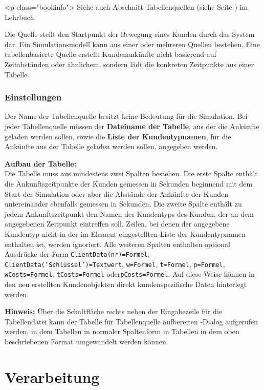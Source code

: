 <p class="bookinfo">
Siehe auch Abschnitt Tabellenquellen (siehe Seite \pageref{ref:book:9.3.1}) im Lehrbuch.

Die Quelle stellt den Startpunkt der Bewegung eines Kunden durch das System dar.
Ein Simulationsmodell kann aus einer oder mehreren Quellen bestehen.
Eine tabellenbasierte Quelle erstellt Kundenankünfte nicht basierend auf
Zeitabständen oder ähnlichem, sondern lädt die konkreten Zeitpunkte aus einer
Tabelle.

\subsection*{Einstellungen}

Der Name der Tabellenquelle besitzt keine Bedeutung für die Simulation.
Bei jeder Tabellenquelle müssen der \textbf{Dateiname der Tabelle}, aus
der die Ankünfte geladen werden sollen, sowie die \textbf{Liste der Kundentypnamen},
für die Ankünfte aus der Tabelle geladen werden sollen, angegeben werden.

\textbf{Aufbau der Tabelle:}~\\
Die Tabelle muss aus mindestens zwei Spalten bestehen. Die erste Spalte enthält die Ankunftszeitpunkte
der Kunden gemessen in Sekunden beginnend mit dem Start der Simulation oder aber die Abstände
der Ankünfte der Kunden untereinander ebenfalls gemessen in Sekunden. Die zweite Spalte
enthält zu jedem Ankunftszeitpunkt den Namen des Kundentyps des Kunden, der an dem
angegebenen Zeitpunkt eintreffen soll. Zeilen, bei denen der angegebene Kundentyp
nicht in der im Element eingestellten Liste der Kundentypnamen enthalten ist, werden ignoriert.
Alle weiteren Spalten enthalten optional Ausdrücke der Form \texttt{ClientData(nr)=Formel},
\texttt{ClientData('Schlüssel')=Textwert}, \texttt{w=Formel}, \texttt{t=Formel},
\texttt{p=Formel}, \texttt{wCosts=Formel}, \texttt{tCosts=Formel} oder\texttt{pCosts=Formel}.
Auf diese Weise können in den neu erstellten Kundenobjekten direkt kundenspezifische Daten
hinterlegt werden. 

\textbf{Hinweis:}
Über die Schaltfläche rechts neben der Eingabezeile für die Tabellendatei kann der
Tabelle für Tabellenquelle aufbereiten -Dialog
aufgerufen werden, in dem Tabellen in normaler Spaltenform in Tabellen in dem oben
beschriebenen Format umgewandelt werden können.





\chapter{Verarbeitung}

